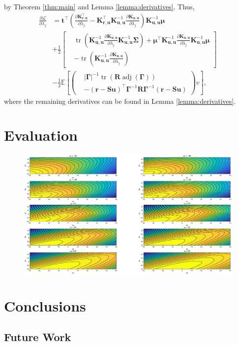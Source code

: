 \documentclass{mpaper}
\DeclareMathOperator{\adj}{adj}
\DeclareMathOperator{\tr}{tr}
\newcommand{\Kuu}{\mathbf{K}_{\mathbf{u},\mathbf{u}}}
\newcommand{\Kru}{\mathbf{K}_{\mathbf{r},\mathbf{u}}}
\begin{document}
by Theorem \ref{thm:main} and Lemma \ref{lemma:derivatives}. Thus,
\[
  \begin{split}
    \frac{\partial \mathcal{L}}{\partial \lambda_j} &=
    \mathbf{t}^\intercal \left( \frac{\partial \Kru^\intercal}{\partial
        \lambda_j} - \Kru^\intercal\Kuu^{-1}\frac{\partial
        \Kuu}{\partial \lambda_j} \right) \Kuu^{-1} \bm\mu \\
    &+ \frac{1}{2} \left[ \begin{split}
      &\tr \left( \Kuu^{-1} \frac{\partial \Kuu}{\partial
          \lambda_j} \Kuu^{-1} \bm\Sigma \right) + \bm\mu^\intercal \Kuu^{-1}
      \frac{\partial \Kuu}{\partial \lambda_j} \Kuu^{-1} \bm\mu \\
      &- \tr \left(\Kuu^{-1} \frac{\partial \Kuu}{\partial \lambda_j} \right)
      \end{split} \right]
    \\
    &- \frac{1}{2} \mathbb{E} \left[ \left( \begin{split}
        &|\bm\Gamma|^{-1} \tr(\mathbf{R} \adj(\bm\Gamma)) \\
          &- (\mathbf{r} -
          \mathbf{Su})^\intercal\bm\Gamma^{-1}\mathbf{R}\bm\Gamma^{-1}(\mathbf{r}
          - \mathbf{Su})
    \end{split} \right) v \right],
  \end{split}
\]
where the remaining derivatives can be found in Lemma \ref{lemma:derivatives}.

\section{Evaluation} %


\begin{figure}
  \centering
  \includegraphics[width=\textwidth]{elbo_contour_plots}
\end{figure}

\section{Conclusions}

\subsection{Future Work}



\end{document}
